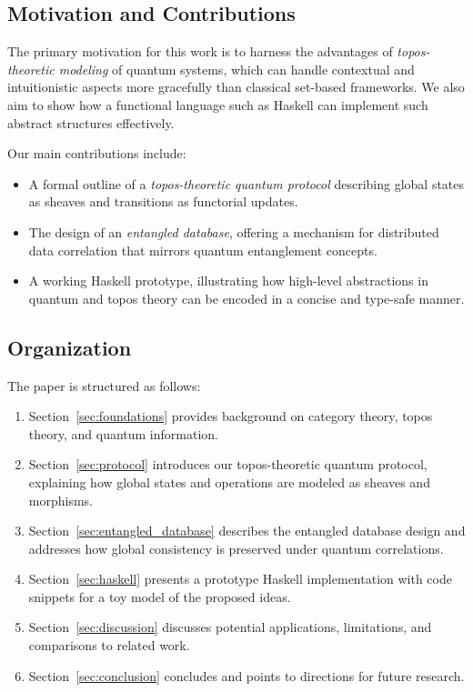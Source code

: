 \documentclass[11pt]{article}
\begin{document}
\subsection{Motivation and Contributions}
The primary motivation for this work is to harness the advantages of \emph{topos-theoretic modeling} of quantum systems, which can handle contextual and intuitionistic aspects more gracefully than classical set-based frameworks. We also aim to show how a functional language such as Haskell can implement such abstract structures effectively.

Our main contributions include:
\begin{itemize}
    \item A formal outline of a \emph{topos-theoretic quantum protocol} describing global states as sheaves and transitions as functorial updates.
    \item The design of an \emph{entangled database}, offering a mechanism for distributed data correlation that mirrors quantum entanglement concepts.
    \item A working Haskell prototype, illustrating how high-level abstractions in quantum and topos theory can be encoded in a concise and type-safe manner.
\end{itemize}

\subsection{Organization}
The paper is structured as follows:
\begin{enumerate}[label=(\alph*)]
    \item Section~\ref{sec:foundations} provides background on category theory, topos theory, and quantum information.
    \item Section~\ref{sec:protocol} introduces our topos-theoretic quantum protocol, explaining how global states and operations are modeled as sheaves and morphisms.
    \item Section~\ref{sec:entangled_database} describes the entangled database design and addresses how global consistency is preserved under quantum correlations.
    \item Section~\ref{sec:haskell} presents a prototype Haskell implementation with code snippets for a toy model of the proposed ideas.
    \item Section~\ref{sec:discussion} discusses potential applications, limitations, and comparisons to related work.
    \item Section~\ref{sec:conclusion} concludes and points to directions for future research.
\end{enumerate}
\end{document}
